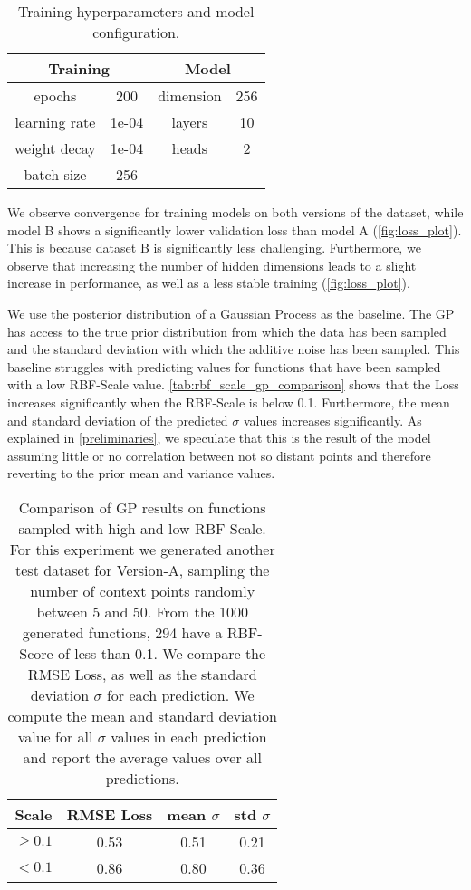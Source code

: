 \begin{table}[]
	\centering
	\caption{Training hyperparameters and model configuration.}
	\begin{tabular}{c c c c}
		\toprule
		\multicolumn{2}{c}{Training} & \multicolumn{2}{c}{Model} \\
		\midrule
		epochs & 200 & dimension & 256 \\
		learning rate & 1e-04 & layers & 10\\
		weight decay & 1e-04 & heads & 2  \\
		batch size & 256 & \\\bottomrule
	\end{tabular}
	\label{tab:hyperparams}
\end{table}

We observe convergence for training models on both versions of the dataset, while model B shows a significantly lower validation loss than model A (\autoref{fig:loss_plot}). This is because dataset B is significantly less challenging. Furthermore, we observe that increasing the number of hidden dimensions leads to a slight increase in performance, as well as a less stable training (\autoref{fig:loss_plot}).

We use the posterior distribution of a Gaussian Process as the baseline. The GP has access to the true prior distribution from which the data has been sampled and the standard deviation with which the additive noise has been sampled. This baseline struggles with predicting values for functions that have been sampled with a low RBF-Scale value. \autoref{tab:rbf_scale_gp_comparison} shows that the Loss increases significantly when the RBF-Scale is below 0.1. Furthermore, the mean and standard deviation of the predicted $\sigma$ values increases significantly. As explained in \autoref{preliminaries}, we speculate that this is the result of the model assuming little or no correlation between not so distant points and therefore reverting to the prior mean and variance values.

\begin{table}[]
	\centering
	\caption{Comparison of GP results on functions sampled with high and low RBF-Scale. For this experiment we generated another test dataset for Version-A, sampling the number of context points randomly between 5 and 50. From the 1000 generated functions, 294 have a RBF-Score of less than 0.1. We compare the RMSE Loss, as well as the standard deviation $\sigma$ for each prediction. We compute the mean and standard deviation value for all $\sigma$ values in each prediction and report the average values over all predictions.}
	\begin{tabular}{c c c c}
		\toprule
		Scale & RMSE Loss & mean $\sigma$ & std $\sigma$\\
		\midrule
		$\geq 0.1$ & 0.53 & 0.51 & 0.21\\
		$< 0.1$ & 0.86 & 0.80 & 0.36\\\bottomrule
	\end{tabular}
	\label{tab:rbf_scale_gp_comparison}
\end{table}


